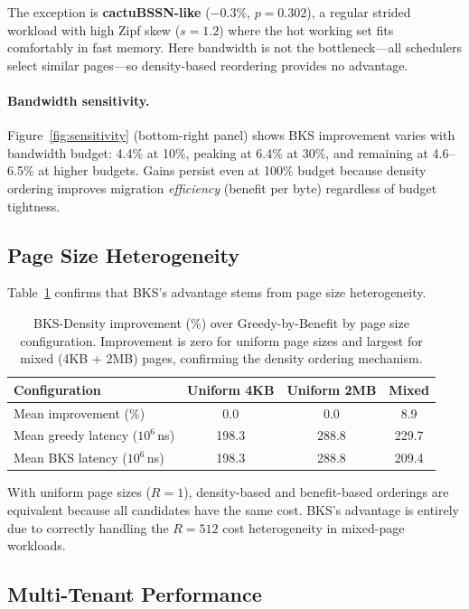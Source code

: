 \documentclass{article}
\begin{document}
The exception is \textbf{cactuBSSN-like} ($-0.3\%$, $p = 0.302$), a regular strided workload with high Zipf skew ($s = 1.2$) where the hot working set fits comfortably in fast memory. Here bandwidth is not the bottleneck---all schedulers select similar pages---so density-based reordering provides no advantage.

\paragraph{Bandwidth sensitivity.} Figure~\ref{fig:sensitivity} (bottom-right panel) shows BKS improvement varies with bandwidth budget: 4.4\% at 10\%, peaking at 6.4\% at 30\%, and remaining at 4.6--6.5\% at higher budgets. Gains persist even at 100\% budget because density ordering improves migration \emph{efficiency} (benefit per byte) regardless of budget tightness.

\subsection{Page Size Heterogeneity}

Table~\ref{tab:heterogeneity} confirms that BKS's advantage stems from page size heterogeneity.

\begin{table}[t]
\caption{BKS-Density improvement (\%) over Greedy-by-Benefit by page size configuration. Improvement is zero for uniform page sizes and largest for mixed (4KB + 2MB) pages, confirming the density ordering mechanism.}
\label{tab:heterogeneity}
\centering
\begin{tabular}{lccc}
\toprule
Configuration & Uniform 4KB & Uniform 2MB & Mixed \\
\midrule
Mean improvement (\%) & 0.0 & 0.0 & 8.9 \\
Mean greedy latency ($10^6$\,ns) & 198.3 & 288.8 & 229.7 \\
Mean BKS latency ($10^6$\,ns) & 198.3 & 288.8 & 209.4 \\
\bottomrule
\end{tabular}
\end{table}

With uniform page sizes ($R = 1$), density-based and benefit-based orderings are equivalent because all candidates have the same cost. BKS's advantage is entirely due to correctly handling the $R = 512$ cost heterogeneity in mixed-page workloads.

\subsection{Multi-Tenant Performance}
\end{document}
